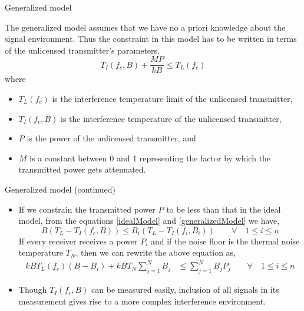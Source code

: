 \documentclass[mathserif]{beamer}
\begin{document}
\begin{frame}{Generalized model}

The generalized model assumes that we have no a priori knowledge about the signal environment. Thus the constraint in this model has to be written in terms of the unlicensed transmitter's parameters.
\begin{equation}
    T_I(f_c,B) + \frac{MP}{kB} \leq T_L(f_c) \label{generalizedModel}
\end{equation}
where
\pause
\begin{itemize}
	\item $T_L(f_c)$ is the interference temperature limit of the unlicensed transmitter,
	\item $T_I(f_c,B)$ is the interference temperature of the unlicensed transmitter, 
	\item $P$ is the power of the unlicensed transmitter, and
	\item $M$ is a constant between 0 and 1 representing the factor by which the transmitted power gets attenuated.
\end{itemize}

\end{frame}


\begin{frame}{Generalized model (continued)}

\begin{itemize}
\item If we constrain the transmitted power $P$ to be less than that in the ideal model, from the equations \eqref{idealModel} and \eqref{generalizedModel} we have,
\begin{equation*}
    B(T_L - T_I(f_c,B)) \leq  B_i(T_L - T_I(f_i,B_i)) \qquad \forall \quad 1 \leq i \leq n \label{powerCompare}
\end{equation*}
If every receiver receives a power $P_i$ and if the noise floor is the thermal noise temperature $T_N$, then we can rewrite the above equation as,
\begin{align*}
    kBT_L(f_c)(B-B_i) + kBT_N\sum_{j=1}^{N}B_j & \leq \sum_{j=1}^{N}B_jP_j \qquad \forall \quad 1 \leq i\leq n
\end{align*}

\pause
\item
Though $T_I(f_c,B)$ can be measured easily, inclusion of all signals in its measurement gives rise to a more complex interference environment.

\end{itemize}

\end{frame}
\end{document}
